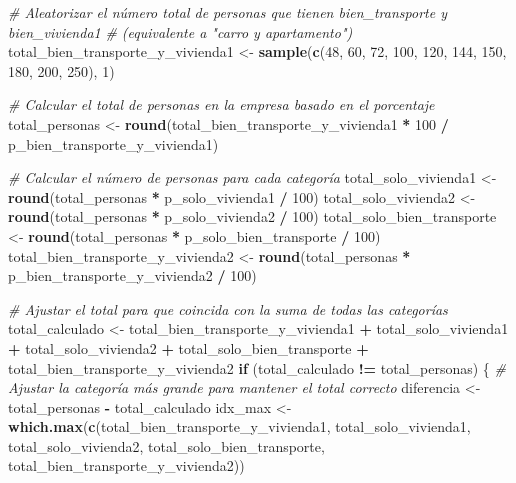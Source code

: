 \documentclass[
]{article}
\newenvironment{Shaded}{\begin{snugshade}}{\end{snugshade}}
\newcommand{\CommentTok}[1]{\textcolor[rgb]{0.56,0.35,0.01}{\textit{#1}}}
\newcommand{\ControlFlowTok}[1]{\textcolor[rgb]{0.13,0.29,0.53}{\textbf{#1}}}
\newcommand{\DecValTok}[1]{\textcolor[rgb]{0.00,0.00,0.81}{#1}}
\newcommand{\FunctionTok}[1]{\textcolor[rgb]{0.13,0.29,0.53}{\textbf{#1}}}
\newcommand{\NormalTok}[1]{#1}
\newcommand{\OtherTok}[1]{\textcolor[rgb]{0.56,0.35,0.01}{#1}}
\newcommand{\SpecialCharTok}[1]{\textcolor[rgb]{0.81,0.36,0.00}{\textbf{#1}}}
\begin{document}
\begin{Shaded}
\begin{Highlighting}[]
\CommentTok{\# Aleatorizar el número total de personas que tienen bien\_transporte y bien\_vivienda1}
\CommentTok{\# (equivalente a "carro y apartamento")}
\NormalTok{total\_bien\_transporte\_y\_vivienda1 }\OtherTok{\textless{}{-}} \FunctionTok{sample}\NormalTok{(}\FunctionTok{c}\NormalTok{(}\DecValTok{48}\NormalTok{, }\DecValTok{60}\NormalTok{, }\DecValTok{72}\NormalTok{, }\DecValTok{100}\NormalTok{, }\DecValTok{120}\NormalTok{, }\DecValTok{144}\NormalTok{, }\DecValTok{150}\NormalTok{, }\DecValTok{180}\NormalTok{, }\DecValTok{200}\NormalTok{, }\DecValTok{250}\NormalTok{), }\DecValTok{1}\NormalTok{)}

\CommentTok{\# Calcular el total de personas en la empresa basado en el porcentaje}
\NormalTok{total\_personas }\OtherTok{\textless{}{-}} \FunctionTok{round}\NormalTok{(total\_bien\_transporte\_y\_vivienda1 }\SpecialCharTok{*} \DecValTok{100} \SpecialCharTok{/}\NormalTok{ p\_bien\_transporte\_y\_vivienda1)}

\CommentTok{\# Calcular el número de personas para cada categoría}
\NormalTok{total\_solo\_vivienda1 }\OtherTok{\textless{}{-}} \FunctionTok{round}\NormalTok{(total\_personas }\SpecialCharTok{*}\NormalTok{ p\_solo\_vivienda1 }\SpecialCharTok{/} \DecValTok{100}\NormalTok{)}
\NormalTok{total\_solo\_vivienda2 }\OtherTok{\textless{}{-}} \FunctionTok{round}\NormalTok{(total\_personas }\SpecialCharTok{*}\NormalTok{ p\_solo\_vivienda2 }\SpecialCharTok{/} \DecValTok{100}\NormalTok{)}
\NormalTok{total\_solo\_bien\_transporte }\OtherTok{\textless{}{-}} \FunctionTok{round}\NormalTok{(total\_personas }\SpecialCharTok{*}\NormalTok{ p\_solo\_bien\_transporte }\SpecialCharTok{/} \DecValTok{100}\NormalTok{)}
\NormalTok{total\_bien\_transporte\_y\_vivienda2 }\OtherTok{\textless{}{-}} \FunctionTok{round}\NormalTok{(total\_personas }\SpecialCharTok{*}\NormalTok{ p\_bien\_transporte\_y\_vivienda2 }\SpecialCharTok{/} \DecValTok{100}\NormalTok{)}

\CommentTok{\# Ajustar el total para que coincida con la suma de todas las categorías}
\NormalTok{total\_calculado }\OtherTok{\textless{}{-}}\NormalTok{ total\_bien\_transporte\_y\_vivienda1 }\SpecialCharTok{+}\NormalTok{ total\_solo\_vivienda1 }\SpecialCharTok{+}\NormalTok{ total\_solo\_vivienda2 }\SpecialCharTok{+}
\NormalTok{                  total\_solo\_bien\_transporte }\SpecialCharTok{+}\NormalTok{ total\_bien\_transporte\_y\_vivienda2}
\ControlFlowTok{if}\NormalTok{ (total\_calculado }\SpecialCharTok{!=}\NormalTok{ total\_personas) \{}
  \CommentTok{\# Ajustar la categoría más grande para mantener el total correcto}
\NormalTok{  diferencia }\OtherTok{\textless{}{-}}\NormalTok{ total\_personas }\SpecialCharTok{{-}}\NormalTok{ total\_calculado}
\NormalTok{  idx\_max }\OtherTok{\textless{}{-}} \FunctionTok{which.max}\NormalTok{(}\FunctionTok{c}\NormalTok{(total\_bien\_transporte\_y\_vivienda1, total\_solo\_vivienda1, total\_solo\_vivienda2,}
\NormalTok{                        total\_solo\_bien\_transporte, total\_bien\_transporte\_y\_vivienda2))}


\end{Highlighting}
\end{Shaded}
\end{document}
